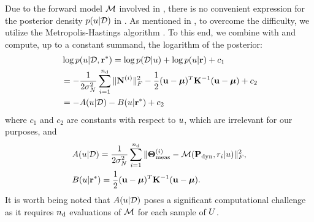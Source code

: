 Due to the forward model $\model$ involved in , there is no convenient expression for the posterior density $\f{\u | \data}$ in . As mentioned in , to overcome the difficulty, we utilize the Metropolis-Hastings algorithm \cite{gelman2004}. To this end, we combine  with  and compute, up to a constant summand, the logarithm of the posterior:
\begin{align*}
  & \log \f{\u | \data, \vr^*} = \log \f{\data | \u} + \log \f{\u | \vr} + c_1 \\
  & = -\frac{1}{2 \sigma^2_\noise} \sum_{i = 1}^\ndata \fnorm{\mnoise^{(i)}}^2 -\frac{1}{2} (\vu - \vfMean)^T \mCov^{-1} (\vu - \vfMean) + c_2 \\
  & = - A(\u | \data) - B(\u | \vr^*) + c_2
\end{align*}
where $c_1$ and $c_2$ are constants with respect to $u$, which are irrelevant for our purposes, and
\begin{align*}
  & A(\u | \data ) = \frac{1}{2 \sigma^2_\noise} \sum_{i = 1}^\ndata \fnorm{\mT^{(i)}_{\meas} - \model{\mP_\dyn, \r_i | \u}}^2, \\
  & B(\u | \vr^*) = \frac{1}{2} (\vu - \vfMean)^T \mCov^{-1} (\vu - \vfMean).
\end{align*}
It is worth being noted that $A(u | \mathcal{D})$ poses a significant computational challenge as it requires ${n_\text{d}}$ evaluations of $\model$ for each sample of $U$.

